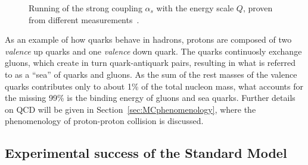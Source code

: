 \begin{figure}[tbph]
\begin{center}
\caption{Running of the strong coupling $\alpha_s$ with the energy scale $Q$,
proven from different measurements~\cite{alpha_s}.}
\label{fig:alpha_s}
\end{center}
\end{figure}

As an example of how quarks behave in hadrons,
protons are composed of two {\it valence} up quarks
and one {\it valence} down quark. The quarks continuosly
exchange gluons, which create in turn quark-antiquark pairs,
resulting in what is referred to as a ``sea'' 
of quarks and gluons. 
As the sum of the rest masses of the valence quarks contributes 
only to about 1\% of the total nucleon
mass, what accounts for the missing 99\% is the
binding energy of gluons and sea quarks.
Further details on QCD will be given in Section~\ref{sec:MCphenomenology},
where the phenomenology of proton-proton collision
is discussed.



\subsection{Experimental success of the Standard Model}\label{sec:THsuccess}

